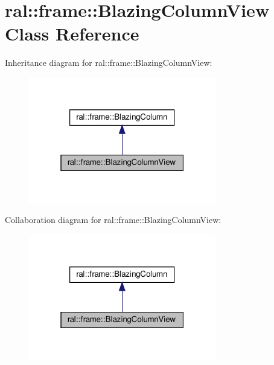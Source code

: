 \hypertarget{classral_1_1frame_1_1BlazingColumnView}{}\section{ral\+:\+:frame\+:\+:Blazing\+Column\+View Class Reference}
\label{classral_1_1frame_1_1BlazingColumnView}


Inheritance diagram for ral\+:\+:frame\+:\+:Blazing\+Column\+View\+:\nopagebreak
\begin{figure}[H]
\begin{center}
\leavevmode
\includegraphics[width=232pt]{classral_1_1frame_1_1BlazingColumnView__inherit__graph}
\end{center}
\end{figure}


Collaboration diagram for ral\+:\+:frame\+:\+:Blazing\+Column\+View\+:\nopagebreak
\begin{figure}[H]
\begin{center}
\leavevmode
\includegraphics[width=232pt]{classral_1_1frame_1_1BlazingColumnView__coll__graph}
\end{center}
\end{figure}
